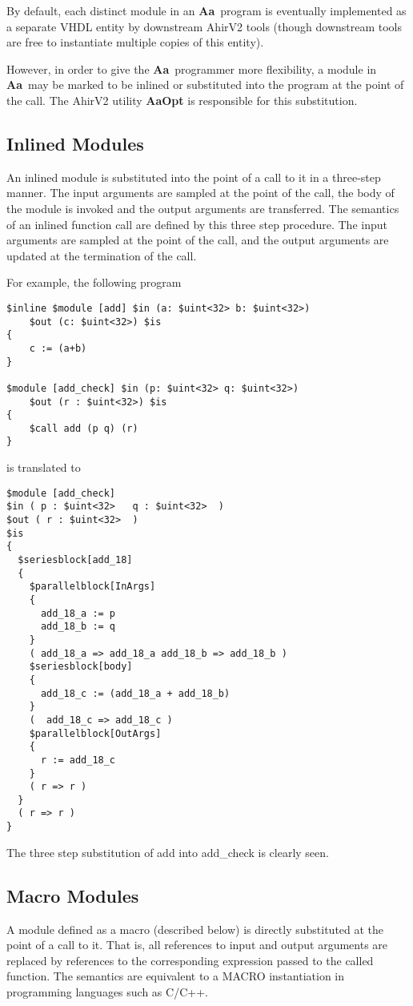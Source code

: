 \documentclass{article}
\newcommand{\Aa}{{\bf Aa}~}
\begin{document}
By default, each distinct module in an \Aa program
is eventually implemented as a separate VHDL entity
by downstream AhirV2 tools (though downstream
tools are free to instantiate multiple
copies of this entity).  

However, in order to give the \Aa programmer
more flexibility,  a module in \Aa may be marked
to be inlined or substituted into the program
at the point of the call.  The AhirV2 utility
{\bf AaOpt} is responsible for this substitution.


\subsection{Inlined Modules}

An inlined module is substituted into the
point of a call to it in a three-step manner.
The input arguments are sampled at the point
of the call, the body of
the module is invoked and the output arguments
are transferred.  The semantics of an inlined
function call are defined by this three step
procedure.  The input arguments are sampled
at the point of the call, and the output
arguments are updated at the termination of
the call.

For example, the following
program 
\begin{verbatim}
$inline $module [add] $in (a: $uint<32> b: $uint<32>)
    $out (c: $uint<32>) $is
{
    c := (a+b)
}  

$module [add_check] $in (p: $uint<32> q: $uint<32>) 
    $out (r : $uint<32>) $is
{
    $call add (p q) (r)
}
\end{verbatim}
is translated to
\begin{verbatim}
$module [add_check]
$in ( p : $uint<32>   q : $uint<32>  )
$out ( r : $uint<32>  )
$is
{
  $seriesblock[add_18] 
  {
    $parallelblock[InArgs] 
    {
      add_18_a := p
      add_18_b := q
    }
    ( add_18_a => add_18_a add_18_b => add_18_b )
    $seriesblock[body] 
    {
      add_18_c := (add_18_a + add_18_b)
    }
    (  add_18_c => add_18_c )
    $parallelblock[OutArgs] 
    {
      r := add_18_c
    }
    ( r => r )
  }
  ( r => r )
}
\end{verbatim}
The three step substitution of add into add\_check
is clearly seen.


\subsection{Macro Modules}

A module defined as a macro (described below)
is directly substituted at the point of a call
to it.  That is, all references to input and
output arguments
are replaced by references to the corresponding
expression passed to the called function.  
The semantics are equivalent to a MACRO instantiation
in programming languages such as C/C++.
\end{document}
